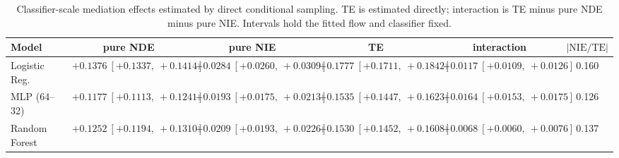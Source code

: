 \begin{table}[htbp]
  \centering
  \caption{Classifier-scale mediation effects estimated by direct conditional sampling. TE is estimated directly; interaction is TE minus pure NDE minus pure NIE. Intervals hold the fitted flow and classifier fixed.}
  \label{tab:adult_gap_overall}
  \begin{tabular}{lccccc}
    \toprule
    Model & pure NDE & pure NIE & TE & interaction & $|\mathrm{NIE}/\mathrm{TE}|$ \\
    \midrule
    Logistic Reg. & $+0.1376\ [+0.1337,\ +0.1414]$ & $+0.0284\ [+0.0260,\ +0.0309]$ & $+0.1777\ [+0.1711,\ +0.1842]$ & $+0.0117\ [+0.0109,\ +0.0126]$ & 0.160 \\
    MLP (64--32) & $+0.1177\ [+0.1113,\ +0.1241]$ & $+0.0193\ [+0.0175,\ +0.0213]$ & $+0.1535\ [+0.1447,\ +0.1623]$ & $+0.0164\ [+0.0153,\ +0.0175]$ & 0.126 \\
    Random Forest & $+0.1252\ [+0.1194,\ +0.1310]$ & $+0.0209\ [+0.0193,\ +0.0226]$ & $+0.1530\ [+0.1452,\ +0.1608]$ & $+0.0068\ [+0.0060,\ +0.0076]$ & 0.137 \\
    \bottomrule
  \end{tabular}
\end{table}